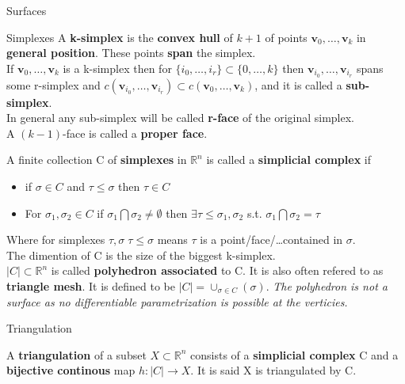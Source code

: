 \documentclass[12pt, letterpaper]{article}
\begin{document}
\begin{section}{Surfaces}
\begin{subsection}{Simplexes}
    A \textbf{k-simplex} is the \textbf{convex hull} of \(k + 1\) of points
    \(\textbf{v}_{0}, \dots , \textbf{v}_{k}\) in \textbf{general position}.
    These points \textbf{span} the simplex. \\
    If \(\textbf{v}_{0}, \dots , \textbf{v}_{k}\) is a k-simplex then for
    \(\{ i_{0}, \dots , i_{r} \} \subset \{ 0, \dots , k \}\) then
    \(\textbf{v}_{i_{0}}, \dots , \textbf{v}_{i_{r}}\) spans some r-simplex and
    \(c(\textbf{v}_{i_{0}}, \dots , \textbf{v}_{i_{r}}) \subset
    c(\textbf{v}_{0}, \dots , \textbf{v}_{k})\), and it is called a \textbf{sub-simplex}. \\
    In general any sub-simplex will be called \textbf{r-face} of the original simplex. \\
    A \((k - 1)\)-face is called a \textbf{proper face}.

    A finite collection C of \textbf{simplexes} in \(\mathbb{R}^{n}\) is called
    a \textbf{simplicial complex } if
    \begin{itemize}
      \item if \(\sigma \in C\) and \(\tau \leq \sigma\) then \(\tau \in C\)
      \item For \(\sigma_{1}, \sigma_{2} \in C\) if
            \(\sigma_{1} \bigcap \sigma_{2} \neq \emptyset\) then
            \(\exists \tau \leq \sigma_{1}, \sigma_{2}\) s.t.
            \(\sigma_{1} \bigcap \sigma_{2} = \tau\)
    \end{itemize}
    Where for simplexes \(\tau, \sigma \; \tau \leq \sigma\) means \(\tau\)
    is a point/face/\dots contained in \(\sigma\). \\
    The dimention of C is the size of the biggest k-simplex. \\
    \(|C| \subset \mathbb{R}^{n}\) is called \textbf{polyhedron associated} to C.
    It is also often refered to as \textbf{triangle mesh}. It is defined to be
    \(|C| = \cup_{\sigma \in C} (\sigma)\).
    \emph{The polyhedron is not a surface as no differentiable parametrization
      is possible at the verticies.}

  \end{subsection}

  \begin{subsection}{Triangulation}

    A \textbf{triangulation} of a subset \(X \subset \mathbb{R}^{n}\) consists
    of a \textbf{simplicial complex} C and a \textbf{bijective continous} map
    \(h: |C| \to X\). It is said X is triangulated by C.


\end{subsection}
\end{section}
\end{document}
